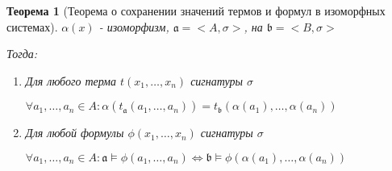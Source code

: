 \documentclass[a4paper]{article}
\newtheorem{theorem}{Теорема}[section]
\theoremstyle{definition}
\theoremstyle{remark}
\begin{document}
    \begin{theorem}[Теорема о сохранении значений термов и формул в изоморфных системах]
        $\alpha(x)$ - изоморфизм, $\mathfrak{a} = <A, \sigma>$, на $\mathfrak{b} = <B, \sigma>$

        Тогда:
        \begin{enumerate}
            \item Для любого терма $t(x_1, \dots, x_n)$ сигнатуры $\sigma$
            
            $\forall a_1, \dots, a_n \in A: \alpha (t_\mathfrak{a}(a_1, \dots, a_n))= t_\mathfrak{b}(\alpha(a_1), \dots, \alpha(a_n))$

            \item Для любой формулы $\phi(x_1, \dots, x_n)$ сигнатуры $\sigma$
            
            $\forall a_1, \dots, a_n \in A: \mathfrak{a}\models \phi(a_1, \dots, a_n)\Leftrightarrow \mathfrak{b} \models \phi(\alpha(a_1), \dots, \alpha(a_n))$
        \end{enumerate}
    \end{theorem}
\end{document}
